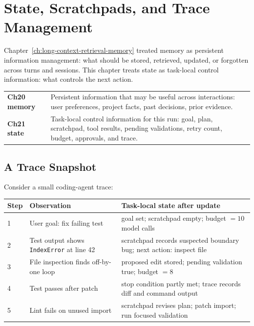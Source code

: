 \section{State, Scratchpads, and Trace Management}
\label{sec:ch21-state-scratchpads-traces}

Chapter~\ref{ch:long-context-retrieval-memory} treated memory as persistent information management: what should be stored, retrieved, updated, or forgotten across turns and sessions. This chapter treats state as task-local control information: what controls the next action.

\begin{center}
\begin{tabularx}{\textwidth}{@{}p{}X@{}}
\toprule
\textbf{Ch20 memory} & Persistent information that may be useful across interactions: user preferences, project facts, past decisions, prior evidence. \\
\textbf{Ch21 state} & Task-local control information for this run: goal, plan, scratchpad, tool results, pending validations, retry count, budget, approvals, and trace. \\
\bottomrule
\end{tabularx}
\end{center}

\subsection{A Trace Snapshot}

Consider a small coding-agent trace:

\begin{center}
\begin{tabularx}{\textwidth}{@{}p{}p{}X@{}}
\toprule
\textbf{Step} & \textbf{Observation} & \textbf{Task-local state after update} \\
\midrule
1 & User goal: fix failing test & goal set; scratchpad empty; budget $=10$ model calls \\
2 & Test output shows \texttt{IndexError} at line 42 & scratchpad records suspected boundary bug; next action: inspect file \\
3 & File inspection finds off-by-one loop & proposed edit stored; pending validation true; budget $=8$ \\
4 & Test passes after patch & stop condition partly met; trace records diff and command output \\
5 & Lint fails on unused import & scratchpad revises plan; patch import; run focused validation \\
\bottomrule
\end{tabularx}
\end{center}

